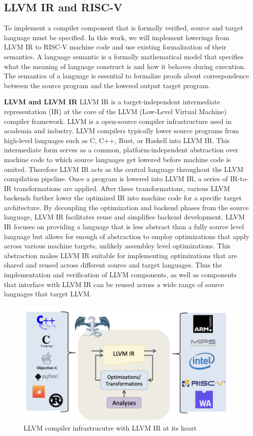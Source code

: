 \subsection {LLVM IR and RISC-V}
To implement a compiler component that is formally verified, source and target language must be specified. In this work, we will implement lowerings from LLVM IR to RISC-V machine code and use existing formalization of their semantics. A language semantic is a formally mathematical model that specifies what the meaning of language construct is and how it behaves during execution. The semantics of a language is essential to formalize proofs about correspondence between the source program and the lowered output target program. 

\textbf{LLVM and LLVM IR}
LLVM IR is a target-independent intermediate representation (IR) at the core of the LLVM (Low-Level Virtual Machine) compiler framework. LLVM is a open-source compiler infrastructure used in academia and industry. LLVM compilers typically lower source programs from high-level languages such as C, C++, Rust, or Haskell into LLVM IR. This intermediate form serves as a common, platform-independent abstraction over machine code to which source languages get lowered before  machine code is omited. Therefore LLVM IR acts as the central language throughout the LLVM compilation pipeline. Once a program is lowered into LLVM IR, a series of IR-to-IR transformations are applied. After these transformations, various LLVM backends further lower the optimized IR into machine code for a specific target architecture. By decoupling the optimization and backend phases from the source language, LLVM IR facilitates reuse and simplifies backend development. LLVM IR focuses on providing a language that is less abstract than a fully source level language but allows for enough of abstraction to employ optimizations that apply across various machine targets, unlikely assembley level optimizations. This abstraction makes LLVM IR suitable for implementing optimizations that are shared and reused across different source and target languages. Thus the implementation and verification of LLVM components, as well as components that interface with LLVM IR can be reused across a wide range of source languages that target LLVM.
\begin{figure}[htbp]
  \centering
  \includegraphics[scale=0.37]{thesis/llvm.png}
 
  \caption{LLVM compiler infrastrucutre with LLVM IR at its heart}
  \label{fig:your-label}
\end{figure}

